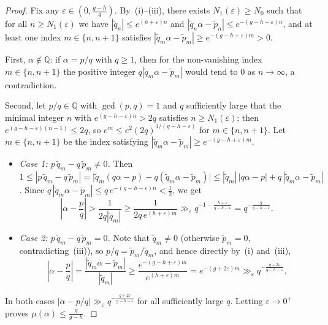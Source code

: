 \documentclass[11pt,reqno]{amsart}
\theoremstyle{definition}
\theoremstyle{remark}
\newcommand{\QQ}{\mathbb{Q}}
\begin{document}
\begin{proof}
Fix any $\varepsilon \in (0, \frac{g - h}{4})$. By~(i)--(iii), there exists $N_1(\varepsilon) \ge N_0$ such that for all $n \ge N_1(\varepsilon)$ we have $|\widetilde{q}_n| \le e^{(h + \varepsilon)n}$ and $|\widetilde{q}_n \alpha - \widetilde{p}_n| \le e^{-(g - h - \varepsilon)n}$, and at least one index $m \in \{n, n+1\}$ satisfies $|\widetilde{q}_m \alpha - \widetilde{p}_m| \ge e^{-(g - h + \varepsilon)m} > 0$.

First, $\alpha \notin \QQ$: if $\alpha = p/q$ with $q \ge 1$, then for the non-vanishing index $m \in \{n, n+1\}$ the positive integer $q|\widetilde{q}_m \alpha - \widetilde{p}_m|$ would tend to $0$ as $n \to \infty$, a contradiction.

Second, let $p/q \in \QQ$ with $\gcd(p, q) = 1$ and $q$ sufficiently large that the minimal integer $n$ with $e^{(g - h - \varepsilon)n} > 2q$ satisfies $n \ge N_1(\varepsilon)$; then $e^{(g - h - \varepsilon)(n - 1)} \le 2q$, so $e^m \le e^2 (2q)^{1/(g - h - \varepsilon)}$ for $m \in \{n, n+1\}$. Let $m \in \{n, n+1\}$ be the index satisfying $|\widetilde{q}_m \alpha - \widetilde{p}_m| \ge e^{-(g - h + \varepsilon)m}$.
\begin{itemize}
  \item \emph{Case 1: $p\,\widetilde{q}_m - q\,\widetilde{p}_m \ne 0$.} Then $1 \le |p\,\widetilde{q}_m - q\,\widetilde{p}_m| = \bigl|\widetilde{q}_m(q\alpha - p) - q(\widetilde{q}_m\alpha - \widetilde{p}_m)\bigr| \le |\widetilde{q}_m|\,|q\alpha - p| + q\,|\widetilde{q}_m\alpha - \widetilde{p}_m|$. Since $q\,|\widetilde{q}_m\alpha - \widetilde{p}_m| \le q\,e^{-(g - h - \varepsilon)n} < \frac{1}{2}$, we get
  \[
    \left|\alpha - \frac{p}{q}\right| > \frac{1}{2q|\widetilde{q}_m|} \ge \frac{1}{2q\, e^{(h + \varepsilon)m}} \gg_\varepsilon q^{-1 - \frac{h+\varepsilon}{g-h-\varepsilon}} = q^{-\frac{g}{g-h-\varepsilon}}.
  \]
  \item \emph{Case 2: $p\,\widetilde{q}_m - q\,\widetilde{p}_m = 0$.} Note that $\widetilde{q}_m \ne 0$ (otherwise $\widetilde{p}_m = 0$, contradicting~(iii)), so $p/q = \widetilde{p}_m/\widetilde{q}_m$, and hence directly by~(i) and~(iii),
  \[
    \left|\alpha - \frac{p}{q}\right| = \frac{|\widetilde{q}_m \alpha - \widetilde{p}_m|}{|\widetilde{q}_m|} \ge \frac{e^{-(g - h + \varepsilon)m}}{e^{(h + \varepsilon)m}} = e^{-(g + 2\varepsilon)m} \gg_\varepsilon q^{-\frac{g + 2\varepsilon}{g - h - \varepsilon}}.
  \]
\end{itemize}
In both cases $|\alpha - p/q| \gg_\varepsilon q^{-\frac{g+2\varepsilon}{g-h-\varepsilon}}$ for all sufficiently large $q$. Letting $\varepsilon \to 0^+$ proves $\mu(\alpha) \le \frac{g}{g - h}$.
\end{proof}
\end{document}
